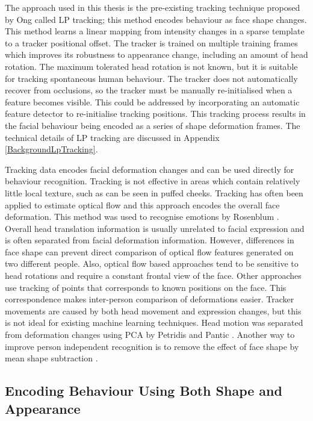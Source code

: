 The approach used in this thesis is the pre-existing tracking technique proposed by Ong \etal \cite{Ong2009} called \acf{LP} tracking; this method encodes behaviour as face shape changes. This method learns a linear mapping from intensity changes in a sparse template to a tracker positional offset. The tracker is trained on multiple training frames which improves its robustness to appearance change, including an amount of head rotation. The maximum tolerated head rotation is not known, but it is suitable for tracking spontaneous human behaviour. The tracker does not automatically recover from occlusions, so the tracker must be manually re-initialised when a feature becomes visible. This could be addressed by incorporating an automatic feature detector to re-initialise tracking positions. This tracking process results in the facial behaviour being encoded as a series of shape deformation frames. The technical details of \ac{LP} tracking are discussed in Appendix \ref{BackgroundLpTracking}.

Tracking data encodes facial deformation changes and can be used directly for behaviour recognition. Tracking is not effective in areas which contain relatively little local texture, such as can be seen in puffed cheeks. Tracking has often been applied to estimate optical flow and this approach encodes the overall face deformation. This method was used to recognise emotions by Rosenblum \etal \cite{Rosenblum1996}. Overall head translation information is usually unrelated to facial expression and is often separated from facial deformation information. However, differences in face shape can prevent direct comparison of optical flow features generated on two different people. Also, optical flow based approaches tend to be sensitive to head rotations and require a constant frontal view of the face. Other approaches use tracking of points that corresponds to known positions on the face. This correspondence makes inter-person comparison of deformations easier. Tracker movements are caused by both head movement and expression changes, but this is not ideal for existing machine learning techniques. Head motion was separated from deformation changes using \ac{PCA} by Petridis and Pantic \cite{Petridis2008}. Another way to improve person independent recognition is to remove the effect of face shape by mean shape subtraction \cite{Tax2011}.


\subsection{Encoding Behaviour Using Both Shape and Appearance}

